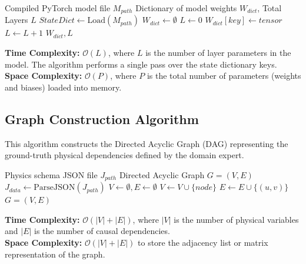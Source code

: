 \documentclass[12pt,singleside,a4paper]{article}
\begin{document}
\begin{algorithm}[H]
\caption{Model State Extraction (Parse-Model)}
\begin{algorithmic}[1]
\Require Compiled PyTorch model file $M_{path}$
\Ensure Dictionary of model weights $W_{dict}$, Total Layers $L$
\State $StateDict \gets \text{Load}(M_{path})$
\State $W_{dict} \gets \emptyset$
\State $L \gets 0$
        \State $W_{dict}[key] \gets tensor$
        \State $L \gets L + 1$
    \EndIf
\EndFor
\State \Return $W_{dict}, L$
\end{algorithmic}
\end{algorithm}

\textbf{Time Complexity:} $\mathcal{O}(L)$, where $L$ is the number of layer parameters in the model. The algorithm performs a single pass over the state dictionary keys. \\
\textbf{Space Complexity:} $\mathcal{O}(P)$, where $P$ is the total number of parameters (weights and biases) loaded into memory.

\subsection{Graph Construction Algorithm}
This algorithm constructs the Directed Acyclic Graph (DAG) representing the ground-truth physical dependencies defined by the domain expert.

\begin{algorithm}[H]
\caption{Build Causal Graph (Construct-DAG)}
\begin{algorithmic}[1]
\Require Physics schema JSON file $J_{path}$
\Ensure Directed Acyclic Graph $G = (V, E)$
\State $J_{data} \gets \text{ParseJSON}(J_{path})$
\State $V \gets \emptyset, E \gets \emptyset$
    \State $V \gets V \cup \{node\}$
\EndFor
{}
        \State $E \gets E \cup \{(u, v)\}$
    \EndIf
\EndFor
\State \Return $G = (V, E)$
\end{algorithmic}
\end{algorithm}

\textbf{Time Complexity:} $\mathcal{O}(|V| + |E|)$, where $|V|$ is the number of physical variables and $|E|$ is the number of causal dependencies. \\
\textbf{Space Complexity:} $\mathcal{O}(|V| + |E|)$ to store the adjacency list or matrix representation of the graph.
\end{document}
